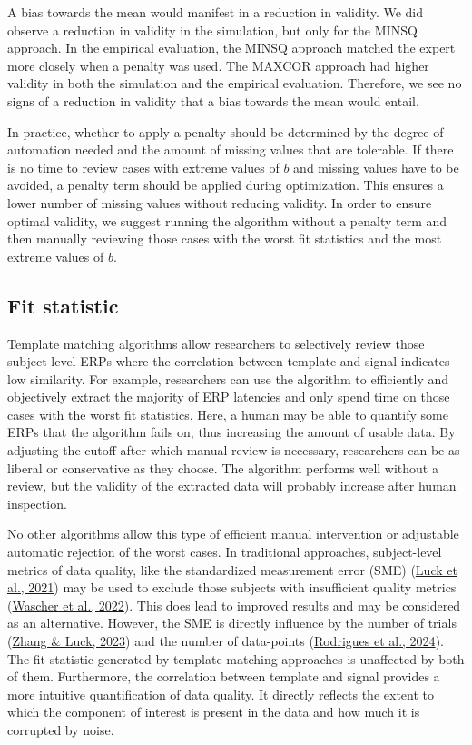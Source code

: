 \documentclass[
  man]{apa7}
\begin{document}
A bias towards the mean would manifest in a reduction in validity. We did observe a reduction in validity in the simulation, but only for the MINSQ approach. In the empirical evaluation, the MINSQ approach matched the expert more closely when a penalty was used. The MAXCOR approach had higher validity in both the simulation and the empirical evaluation. Therefore, we see no signs of a reduction in validity that a bias towards the mean would entail.

In practice, whether to apply a penalty should be determined by the degree of automation needed and the amount of missing values that are tolerable. If there is no time to review cases with extreme values of \(b\) and missing values have to be avoided, a penalty term should be applied during optimization. This ensures a lower number of missing values without reducing validity. In order to ensure optimal validity, we suggest running the algorithm without a penalty term and then manually reviewing those cases with the worst fit statistics and the most extreme values of \(b\).

\hypertarget{fit-statistic}{%
\subsection{Fit statistic}\label{fit-statistic}}

Template matching algorithms allow researchers to selectively review those subject-level ERPs where the correlation between template and signal indicates low similarity. For example, researchers can use the algorithm to efficiently and objectively extract the majority of ERP latencies and only spend time on those cases with the worst fit statistics. Here, a human may be able to quantify some ERPs that the algorithm fails on, thus increasing the amount of usable data. By adjusting the cutoff after which manual review is necessary, researchers can be as liberal or conservative as they choose. The algorithm performs well without a review, but the validity of the extracted data will probably increase after human inspection.

No other algorithms allow this type of efficient manual intervention or adjustable automatic rejection of the worst cases. In traditional approaches, subject-level metrics of data quality, like the standardized measurement error (SME) (\protect\hyperlink{ref-luck2021standardized}{Luck et al., 2021}) may be used to exclude those subjects with insufficient quality metrics (\protect\hyperlink{ref-wascher2022mental}{Wascher et al., 2022}). This does lead to improved results and may be considered as an alternative. However, the SME is directly influence by the number of trials (\protect\hyperlink{ref-zhang2023variations}{Zhang \& Luck, 2023}) and the number of data-points (\protect\hyperlink{ref-rodrigues2024exploration}{Rodrigues et al., 2024}). The fit statistic generated by template matching approaches is unaffected by both of them. Furthermore, the correlation between template and signal provides a more intuitive quantification of data quality. It directly reflects the extent to which the component of interest is present in the data and how much it is corrupted by noise.
\end{document}
